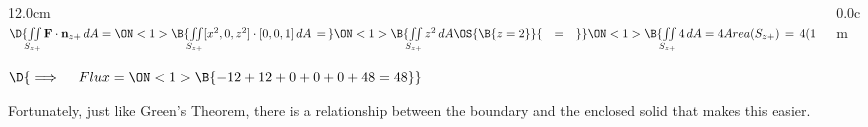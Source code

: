 \begin{frame}
\begin{columns}
\begin{column}{12.0cm}
$\D{\iint \limits_{S_{z+}} {\bf F} \cdot {\bf n}_{z+}\, dA = 
\ON<1>{\B{\iint \limits_{S_{z+}} [x^2,0,z^2] \cdot [0,0,1]\, dA \,=\, }}
\ON<1>{\B{\iint \limits_{S_{z+}} z^2 \, dA \OS{\B{z=2}}{\quad=\quad} }}
\ON<1>{\B{\iint \limits_{S_{z+}} 4 \, dA = 4Area(S_{z+}) \,=\, 4(12) = 48}}}$
	
\vspace{0.3cm}

\begin{center}
	$\D{\implies \quad Flux = \ON<1>{\B{-12+12+0+0+0+48 = 48}}}$
\end{center}

Fortunately, just like Green's Theorem, there is a relationship between the boundary and the enclosed solid that makes this easier.
	
\end{column}\begin{column}{0.0cm}\end{column}\end{columns}
\end{frame}


%
%
%	
%	
%
%
%

